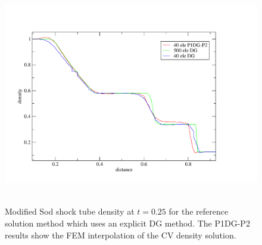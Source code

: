 \begin{figure}[H]
\vbox{
\hbox{
\hspace{-1.cm}
\includegraphics[width=16.0cm]{./doc_figures/shock/test_mod}
}
\vspace{-0.cm}
\vspace{-0.cm}}
\label{sod-dg-density}
\caption{ Modified Sod shock tube density at $t=0.25$ for the 
reference solution method which uses an explicit DG method. The 
P1DG-P2 results show the FEM interpolation of the CV density solution.  }
\end{figure}


